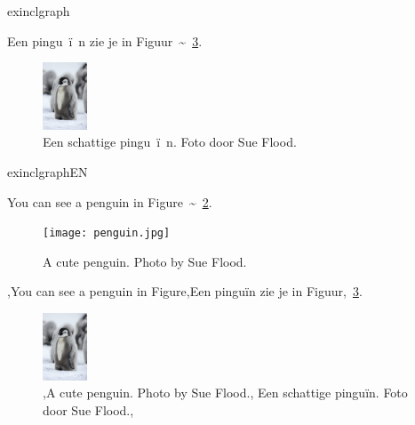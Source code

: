 

\begin{saveblock}{exinclgraph}
	\begin{highlightblock}[linewidth=0.95\textwidth,framexleftmargin=0.25em]
		Een pingu~\"i~n zie je in Figuur~\textasciitilde~\ref{fig:pinguin}.
		\begin{figure}[h]
			\centering
			\includegraphics[height=2cm]{pinguin.jpg}
			\caption{Een schattige pingu~\"i~n. Foto door
			Sue Flood.}\label{fig:pinguin}
		\end{figure}
	\end{highlightblock}
\end{saveblock}

\begin{saveblock}{exinclgraphEN}
	\begin{highlightblock}[linewidth=0.95\textwidth,framexleftmargin=0.25em]
		You can see a penguin in Figure~\textasciitilde~\ref{fig:penguin}.
		\begin{figure}[h]
			\centering
			\texttt{[image: penguin.jpg]}
			\caption{A cute penguin. Photo by Sue Flood.}
			\label{fig:penguin}
		\end{figure}
	\end{highlightblock}
\end{saveblock}

\begin{frame}{%
    }%
	\vspace{-28px}
	
	\begin{penExResult}[3cm]
		\lang,You can see a penguin in Figure,Een pinguïn zie je in Figuur,~\ref{fig:pinguin}.
		\begin{figure}[h]
			\centering
			\includegraphics[height=2cm]{assets/pinguin.jpg}
			\caption{\lang,A cute penguin. Photo by Sue Flood.,%
			Een schattige pinguïn. Foto door Sue Flood.,}\label{fig:pinguin}
		\end{figure}
	\end{penExResult}
\end{frame}

